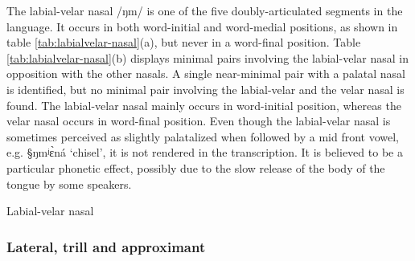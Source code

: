 The labial-velar nasal /ŋm/ is one of the five doubly-articulated segments in
the language. It occurs in both word-initial and word-medial positions, as shown
in table \ref{tab:labialvelar-nasal}(a),  but  never in a word-final position.
Table \ref{tab:labialvelar-nasal}(b) displays  minimal pairs involving the
labial-velar nasal  in opposition with the other nasals. A single near-minimal
pair with a palatal nasal is identified, but no minimal pair involving the
labial-velar and the velar  nasal is found. The labial-velar nasal   mainly
occurs in word-initial position, whereas the velar nasal occurs  in word-final
position.  Even though the labial-velar nasal is sometimes perceived as slightly
palatalized when followed by a mid front vowel, e.g. {\S ŋmʲɛ̀ná} `chisel', it
is not rendered in the transcription. It is believed to be a particular phonetic
effect, possibly due to the slow release of the body of the tongue by some
speakers. 



\begin{table}[!htb]
\centering
\caption{Labial-velar nasal\label{tab:labialvelar-nasal}}

\quad
{}


\end{table}




\subsubsection{Lateral, trill and approximant}
\label{sec:approx}


